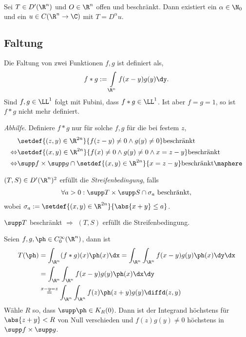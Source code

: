 \begin{bem}
\label{bem:3.30}
Sei $T\in D'(\R^n)$ und $O\in\R^n$ offen und beschränkt. Dann existiert ein
$\alpha\in \N_0$ und ein $u\in C(\R^n\to\C)$ mit $T = D^\alpha u$.\maphere
\end{bem}

\subsection{Faltung}

\begin{bemn}[Erinnerung.]
Die Faltung von zwei Funktionen $f,g$ ist definiert als,
\begin{align*}
f*g := \int\limits_{\R^n} f(x-y)g(y)\dy.
\end{align*}
Sind $f,g\in\LL^1$ folgt mit Fubini, dass $f*g\in\LL^1$. Ist aber $f=g=1$, so
ist $f*g$ nicht mehr definiert.

\textit{Abhilfe}. Definiere $f*g$ nur für solche $f,g$ für die bei festem $z$,
\begin{align*}
&\setdef{(z,y)\in\R^{2n}}{f(z-y) \neq 0\land g(y)\neq 0}\text{beschränkt}\\
\Leftrightarrow &
\setdef{(x,y)\in\R^{2n}}{f(x) \neq 0\land g(y)\neq 0\land
x=z-y}\text{beschränkt}\\ \Leftrightarrow &
\supp f\times \supp g \cap
\setdef{(x,y)\in\R^{2n}}{x=z-y}\text{beschränkt}\maphere
\end{align*}
\end{bemn}

\begin{defn}
\label{defn:3.31}
$(T,S)\in D'(\R^n)^2$ erfüllt die \emph{Streifenbedingung}, falls
\begin{align*}
\forall a> 0 : \supp T \times \supp S \cap \sigma_a\text{ beschränkt},
\end{align*}
wobei $\sigma_a := \setdef{(x,y)\in\R^{2n}}{\abs{x+y}\le a}$.\fishhere
\end{defn}

\begin{bsp}
\label{bsp:3.32}
$\supp T$ beschränkt $\Rightarrow$ $(T,S)$ erfüllt die Streifenbedingung.
\end{bsp}

\begin{bem}
\label{bem:3.33}
Seien $f,g,\ph\in C_0^\infty(\R^n)$, dann ist
\begin{align*}
T(\ph) &= \int_{\R^n} (f*g)(x)\ph(x)\dx
= \int_{\R^n}\int_{\R^n} f(x-y)g(y)\ph(x)\dy\dx\\
&= \int_{\R^n}\int_{\R^n} f(x-y)g(y)\ph(x)\dx\dy\\
&\overset{x-y = z}{=}
\int_{\R^n}\int_{\R^n} f(z)\ph(z+y)g(y)\diffd(z,y)
\end{align*}
Wähle $R$ so, dass $\supp\ph\in K_R(0)$. Dann ist der Integrand höchstens für
$\abs{z+y}<R$ von Null verschieden und $f(z)g(y)\neq 0$ höchstens in $\supp
f\times\supp g$.\maphere
\end{bem}

